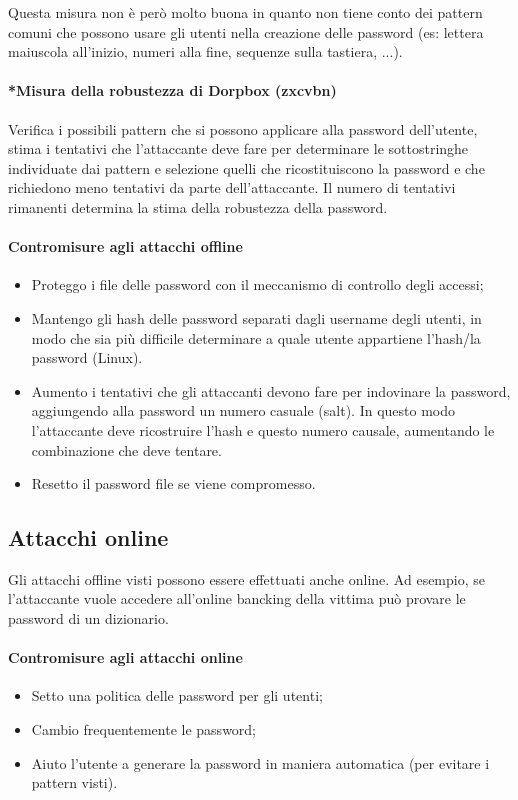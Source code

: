 Questa misura non è però molto buona in quanto non tiene conto dei pattern comuni che possono usare gli utenti nella creazione delle password (es: lettera maiuscola all'inizio, numeri alla fine, sequenze sulla tastiera, ...).

\paragraph{*Misura della robustezza di Dorpbox (zxcvbn)} Verifica i possibili pattern che si possono applicare alla password dell'utente, stima i tentativi che l'attaccante deve fare per determinare le sottostringhe individuate dai pattern e selezione quelli che ricostituiscono la password e che richiedono meno tentativi da parte dell'attaccante. Il numero di tentativi rimanenti determina la stima della robustezza della password.

\paragraph{Contromisure agli attacchi offline}
\begin{itemize}
    \item Proteggo i file delle password con il meccanismo di controllo degli accessi;
    \item Mantengo gli hash delle password separati dagli username degli utenti, in modo che sia più difficile determinare a quale utente appartiene l'hash/la password (Linux).
    \item Aumento i tentativi che gli attaccanti devono fare per indovinare la password, aggiungendo alla password un numero casuale (salt). In questo modo l'attaccante deve ricostruire l'hash e questo numero causale, aumentando le combinazione che deve tentare.
    \item Resetto il password file se viene compromesso.
\end{itemize}

\subsection{Attacchi online}
Gli attacchi offline visti possono essere effettuati anche online. Ad esempio, se l'attaccante vuole accedere all'online bancking della vittima può provare le password di un dizionario.

\paragraph{Contromisure agli attacchi online}
\begin{itemize}
    \item Setto una politica delle password per gli utenti;
    \item Cambio frequentemente le password;
    \item Aiuto l'utente a generare la password in maniera automatica (per evitare i pattern visti).
\end{itemize}

